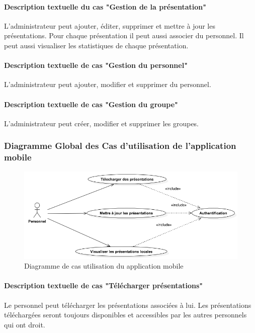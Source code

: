 \documentclass[12pt, ChapStyle1, oneside]{./Styles/Dea_Gsm}
\begin{document}
\paragraph{Description textuelle du cas "Gestion de la présentation"}

L'administrateur peut ajouter, éditer, supprimer et mettre à jour les présentations.
Pour chaque présentation il peut aussi associer du personnel.
Il peut aussi visualiser les statistiques de chaque présentation.
\paragraph{Description textuelle de cas "Gestion du personnel"}
L'administrateur peut ajouter, modifier et supprimer du personnel.
\paragraph{Description textuelle de cas "Gestion du groupe"}
L'administrateur peut créer, modifier et supprimer les groupes.


\subsubsection{Diagramme Global des Cas d’utilisation de l'application mobile}

\begin{figure}[H]
    \centering
    \includegraphics[width=5.0in]{UseCaseDiagramApp}
    \caption{Diagramme de cas utilisation du application mobile}
    \label{UseCaseDiagramWeb}
\end{figure}
\paragraph{Description textuelle de cas "Télécharger présentations"}

Le personnel peut télécharger les présentations associées à lui.
Les présentations téléchargées seront toujours disponibles et accessibles par les autres personnels qui ont droit.
\end{document}
